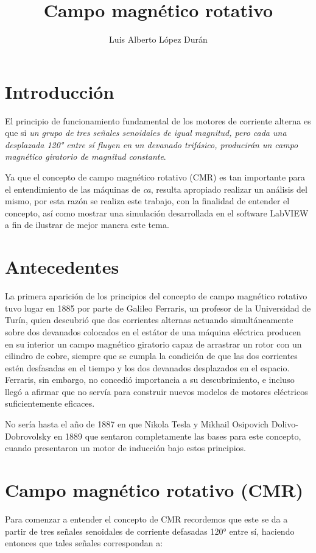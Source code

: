 \documentclass[12pt,a4paper,openany]{article}
\author{Luis Alberto López Durán}
\title{Campo magnético rotativo}
\begin{document}
	\maketitle
	
	\section{Introducción}
	El principio de funcionamiento fundamental de los motores de corriente alterna es que si \textit{un grupo de tres señales senoidales de igual magnitud, pero cada una desplazada 120° entre sí fluyen en un devanado trifásico, producirán un campo magnético giratorio de magnitud constante}. \cite{chapman}
	
	Ya que el concepto de campo magnético rotativo (CMR) es tan importante para el entendimiento de las máquinas de \textit{ca}, resulta apropiado realizar un análisis del mismo, por esta razón se realiza este trabajo, con la finalidad de entender el concepto, así como mostrar una simulación desarrollada en el software LabVIEW a fin de ilustrar de mejor manera este tema.
	
	\section{Antecedentes}
	La primera aparición de los principios del concepto de campo magnético rotativo tuvo lugar en 1885 por parte de Galileo Ferraris, un profesor de la Universidad de Turín, quien descubrió que dos corrientes alternas actuando simultáneamente sobre dos devanados colocados en el estátor de una máquina eléctrica producen en su interior un campo magnético giratorio capaz de arrastrar un rotor con un cilindro de cobre, siempre que se cumpla la condición de que las dos corrientes estén desfasadas en el tiempo y los dos devanados desplazados en el espacio. Ferraris, sin embargo, no concedió importancia a su descubrimiento, e incluso llegó a afirmar que no servía para construir nuevos modelos de motores eléctricos suficientemente eficaces.
	
	No sería hasta el año de 1887 en que Nikola Tesla y Mikhail Osipovich Dolivo-Dobrovolsky en 1889 que sentaron completamente las bases para este concepto, cuando presentaron un motor de inducción bajo estos principios. \cite{internet}
	
	
	\section{Campo magnético rotativo (CMR)}
	Para comenzar a entender el concepto de CMR recordemos que este se da a partir de tres señales senoidales de corriente defasadas 120° entre sí, haciendo entonces que tales señales correspondan a:
	
\end{document}
